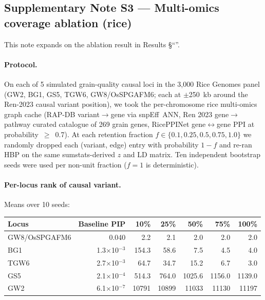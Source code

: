 \clearpage

\subsection*{Supplementary Note S3 --- Multi-omics coverage ablation (rice)}\label{snote:ablation}

This note expands on the ablation result in Results \S``''.

\paragraph{Protocol.} On each of 5 simulated grain-quality causal loci in
the 3{,}000 Rice Genomes panel (GW2, BG1, GS5, TGW6, GW8/OsSPGAFM6; each at
$\pm$250~kb around the Ren-2023 causal variant position), we took the
per-chromosome rice multi-omics graph cache (RAP-DB variant$\to$gene via
snpEff~ANN, Ren 2023 gene$\to$pathway curated catalogue of 269 grain genes,
RicePPINet gene$\leftrightarrow$gene PPI at probability~$\geq$~0.7). At
each retention fraction $f \in \{0.1, 0.25, 0.5, 0.75, 1.0\}$ we randomly
dropped each (variant, edge) entry with probability $1-f$ and re-ran HBP
on the same sumstats-derived $z$ and LD matrix. Ten independent bootstrap
seeds were used per non-unit fraction ($f = 1$ is deterministic).

\paragraph{Per-locus rank of causal variant.} Means over 10 seeds:

\begin{center}
\begin{tabular}{lrrrrrr}
\toprule
\textbf{Locus} & \textbf{Baseline PIP} & \textbf{10\%} & \textbf{25\%} &
\textbf{50\%} & \textbf{75\%} & \textbf{100\%} \\
\midrule
GW8/OsSPGAFM6  & 0.040   &  2.2 &  2.1 &  2.0 &  2.0 &  2.0 \\
BG1          & 1.3$\times$10$^{-3}$ & 154.3 & 58.6 & 7.5 &  4.5 &  4.0 \\
TGW6         & 2.7$\times$10$^{-3}$ &  64.7 & 34.7 & 15.2 &  6.7 &  3.0 \\
GS5          & 2.1$\times$10$^{-4}$ & 514.3 & 764.0 & 1025.6 & 1156.0 & 1139.0 \\
GW2          & 6.1$\times$10$^{-7}$ &10791 &10899 &11033 &11130 &11197 \\
\bottomrule
\end{tabular}
\end{center}

